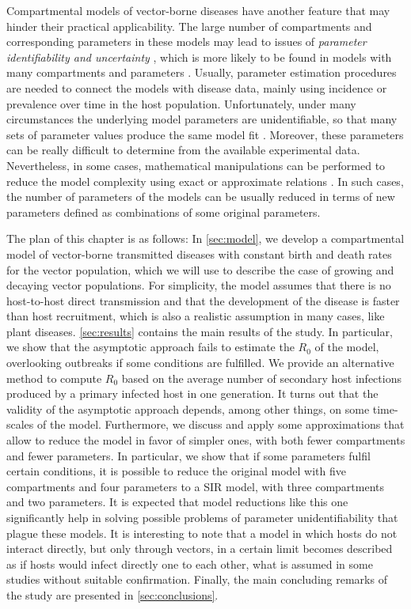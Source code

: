 Compartmental models of vector-borne diseases have another feature that may
hinder their practical applicability. The large number of compartments and
corresponding parameters in these models may lead to issues of
\textit{parameter identifiability and uncertainty} \cite{Chowel2017}, which is
more likely to be found in models with many compartments and parameters
\cite{Roosa2019}. Usually, parameter estimation procedures are needed to
connect the models with disease data, mainly using incidence or prevalence over
time in the host population. Unfortunately, under many circumstances the
underlying model parameters are unidentifiable, so that many sets of parameter
values produce the same model fit \cite{Kao2018}. Moreover, these parameters
can be really difficult to determine from the available experimental data.
Nevertheless, in some cases, mathematical manipulations can be performed to
reduce the model complexity using exact or approximate relations
\cite{GimenezRomero2021}. In such cases, the number of parameters of the models
can be usually reduced in terms of new parameters defined as combinations of
some original parameters.

The plan of this chapter is as follows: In \cref{sec:model}, we develop a
compartmental model of vector-borne transmitted diseases with constant birth
and death rates for the vector population, which we will use to describe
the case of growing and decaying vector populations. For simplicity, the model
assumes that there is no host-to-host direct transmission and that the
development of the disease is faster than host recruitment, which is also a
realistic assumption in  many cases, like plant diseases. \cref{sec:results}
contains the main results of the study. In particular, we show that the
asymptotic approach fails to estimate the $R_0$ of the model, overlooking
outbreaks if some conditions are fulfilled. We provide an alternative
method to compute $R_0$ based on the average number of secondary host
infections produced by a primary infected host in one generation. It turns out
that the validity of the asymptotic approach depends, among other things, on
some time-scales of the model. Furthermore, we discuss and apply some
approximations that allow to reduce the model in favor of simpler ones, with
both fewer compartments and fewer parameters. In particular, we show that if
some parameters fulfil certain conditions, it is possible to reduce the
original model with five compartments and four parameters to a SIR model, with
three compartments and two parameters. It is expected that model reductions
like this one significantly help in solving possible problems of parameter
unidentifiability that plague these models. It is interesting to note that a
model in which hosts do not interact directly, but only through vectors, in a
certain limit becomes described as if hosts would infect directly one to each
other, what is assumed in some studies without suitable confirmation. Finally,
the main concluding remarks of the study are presented in
\cref{sec:conclusions}.

